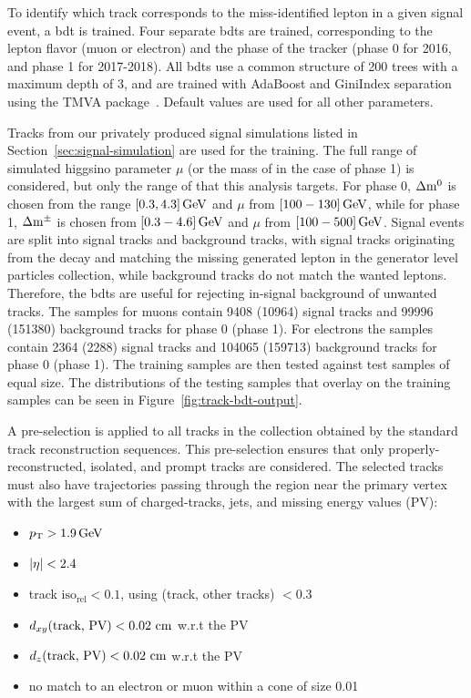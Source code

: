 To identify which track corresponds to the miss-identified lepton in a given signal event, a \gls{bdt} is trained. Four separate \glspl{bdt} are trained, corresponding to the lepton flavor (muon or electron) and the phase of the tracker (phase 0 for 2016, and phase 1 for 2017-2018). All \glspl{bdt} use a common structure of 200 trees with a maximum depth of 3, and are trained with AdaBoost and GiniIndex separation using the TMVA package~\cite{tmva}. Default values are used for all other parameters.

Tracks from our privately produced \FASTSIM signal simulations listed in Section~\ref{sec:signal-simulation} are used for the training. The full range of simulated higgsino parameter $\mu$ (or the mass of \PSGcpmDo in the case of phase 1) is considered, but only the range of \dm that this analysis targets. For phase 0, $\Delta\mathrm{m}^0$ is chosen from the range $[0.3,4.3]\,\text{Ge\hspace{-.08em}V}$ and $\mu$ from $[100-130]\,\text{Ge\hspace{-.08em}V}$, while for phase 1, $\Delta\mathrm{m}^\pm$ is chosen from $[0.3-4.6]\,\text{Ge\hspace{-.08em}V}$ and $\mu$ from $[100-500]\,\text{Ge\hspace{-.08em}V}$. Signal events are split into signal tracks and background tracks, with signal tracks originating from the decay \neuttdecay and matching the missing generated lepton in the generator level particles collection, while background tracks do not match the wanted leptons. Therefore, the \glspl{bdt} are useful for rejecting in-signal background of unwanted tracks. The samples for muons contain 9408 (10964) signal tracks and 99996 (151380) background tracks for phase 0 (phase 1). For electrons the samples contain 2364 (2288) signal tracks and 104065 (159713) background tracks for phase 0 (phase 1). The training samples are then tested against test samples of equal size. The distributions of the testing samples that overlay on the training samples can be seen in Figure~\ref{fig:track-bdt-output}.

A pre-selection is applied to all tracks in the collection obtained by the standard track reconstruction sequences. This pre-selection ensures that only properly-reconstructed, isolated, and prompt tracks are considered. The selected tracks must also have trajectories passing through the region near the primary vertex with the largest sum of charged-tracks, jets, and missing energy values (PV): 

\begin{itemize}
\item $ p_{\mathrm{T}} > 1.9 \,\text{Ge\hspace{-.08em}V}$
\item $ \lvert \eta \rvert < 2.4$
\item track $\text{iso}_\text{rel}  < 0.1$, using \DR(track, other tracks) $< 0.3$
\item $d_{xy}(\text{track, PV}) < 0.02\, \,\text{cm}$ w.r.t the PV
\item $d_z(\text{track, PV}) < 0.02\, \,\text{cm}$ w.r.t the PV
\item no match to an electron or muon within a cone of size 0.01
\end{itemize}

